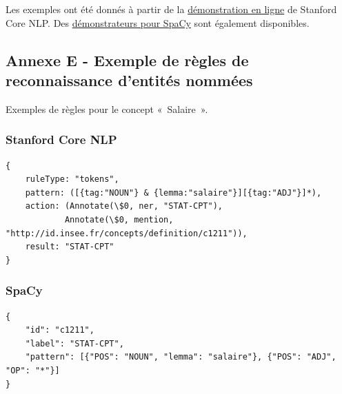 Les exemples ont été donnés à partir de la \href{http://corenlp.run/}{démonstration en ligne} \cite{corenlp-demo} de Stanford Core NLP. Des \href{https://explosion.ai/demos/}{démonstrateurs pour SpaCy} \cite{spacy-demo} sont également disponibles.
\newpage

\subsection*{Annexe E - Exemple de règles de reconnaissance d'entités nommées}

Exemples de règles pour le concept «~Salaire~».
\subsubsection*{Stanford Core NLP}
\begin{lstlisting}
{ 
    ruleType: "tokens", 
    pattern: ([{tag:"NOUN"} & {lemma:"salaire"}][{tag:"ADJ"}]*), 
    action: (Annotate(\$0, ner, "STAT-CPT"), 
            Annotate(\$0, mention, "http://id.insee.fr/concepts/definition/c1211")), 
    result: "STAT-CPT"
}
\end{lstlisting}

\subsubsection*{SpaCy}
\begin{lstlisting}
{ 
    "id": "c1211", 
    "label": "STAT-CPT", 
    "pattern": [{"POS": "NOUN", "lemma": "salaire"}, {"POS": "ADJ", "OP": "*"}] 
}
\end{lstlisting}

\label{rule-exemple}

